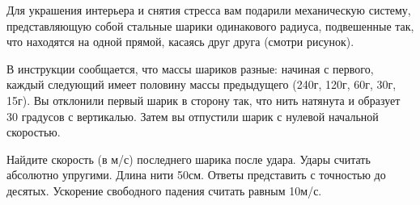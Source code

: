 
Для украшения интерьера и снятия стресса вам подарили механическую систему, 
представляющую собой стальные шарики одинакового радиуса, подвешенные так, что 
находятся на одной прямой, касаясь друг друга (смотри рисунок).


В инструкции сообщается, что массы шариков разные: начиная с первого, каждый следующий имеет 
половину массы предыдущего (240г, 120г, 60г, 30г, 15г). Вы отклонили первый шарик в сторону так, 
что нить натянута и образует 30 градусов с вертикалью. Затем вы отпустили шарик с 
нулевой начальной скоростью.

Найдите скорость (в м/с) последнего шарика после удара. Удары считать абсолютно упругими. Длина нити 50см. Ответы представить с точностью до десятых. Ускорение свободного падения считать равным 10м/с.

